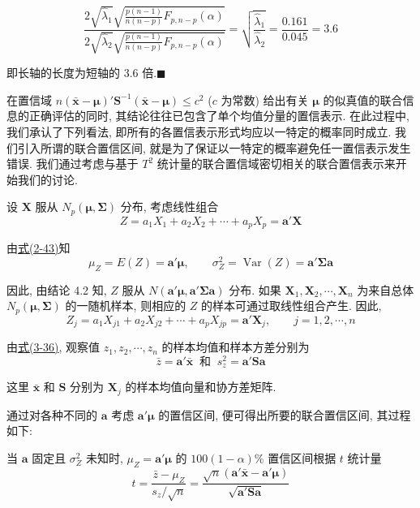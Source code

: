 \[
\frac{2\sqrt{\hat{\lambda}_{1}}\sqrt{\frac{p(n-1)}{n(n-p)}F_{p,n-p}(\alpha)}}{2\sqrt{\hat{\lambda}_{2}}\sqrt{\frac{p(n-1)}{n(n-p)}F_{p,n-p}(\alpha)}}=\sqrt{\frac{\hat{\lambda}_{1}}{\hat{\lambda}_{2}}}=\frac{0.161}{0.045}=3.6
\]

即长轴的长度为短轴的 3.6 倍.\hfill$\blacksquare$


在置信域 $n(\bar{\mathbf{x}}-\boldsymbol{\mu})'\mathbf{S}^{-1}(\bar{\mathbf{x}}-\boldsymbol{\mu})\le c^{2}$ ($c$ 为常数) 给出有关 $\boldsymbol{\mu}$ 的似真值的联合信息的正确评估的同时, 其结论往往已包含了单个均值分量的置信表示. 在此过程中, 我们承认了下列看法, 即所有的各置信表示形式均应以一特定的概率同时成立. 我们引入所谓的联合置信区间, 就是为了保证以一特定的概率避免任一置信表示发生错误. 我们通过考虑与基于 $T^{2}$ 统计量的联合置信域密切相关的联合置信表示来开始我们的讨论.

设 $\mathbf{X}$ 服从 $N_{p}(\boldsymbol{\mu},\boldsymbol{\Sigma})$ 分布, 考虑线性组合
\[
Z=a_{1}X_{1}+a_{2}X_{2}+\cdots+a_{p}X_{p}=\mathbf{a}'\mathbf{X}
\]

由\hyperref[eq:2-43]{式(2-43)}知
\[
\mu_{Z}=E(Z)=\mathbf{a}'\boldsymbol{\mu}, \qquad \sigma_{Z}^{2}=\operatorname{Var}(Z)=\mathbf{a}'\boldsymbol{\Sigma}\mathbf{a}
\]

因此, 由结论 4.2 知, $Z$ 服从 $N(\mathbf{a}'\boldsymbol{\mu},\mathbf{a}'\boldsymbol{\Sigma}\mathbf{a})$ 分布. 如果 $\mathbf{X}_{1},\mathbf{X}_{2},\cdots,\mathbf{X}_{n}$ 为来自总体 $N_{p}(\boldsymbol{\mu},\boldsymbol{\Sigma})$ 的一随机样本, 则相应的 $Z$ 的样本可通过取线性组合产生. 因此,
\[
Z_{j}=a_{1}X_{j1}+a_{2}X_{j2}+\cdots+a_{p}X_{jp}=\mathbf{a}'\mathbf{X}_{j}, \qquad j=1,2,\cdots,n
\]

由\hyperref[eq:3-36]{式(3-36)}, 观察值 $z_{1},z_{2},\cdots,z_{n}$ 的样本均值和样本方差分别为
\[
\bar{z}=\mathbf{a}'\bar{\mathbf{x}} \ \text{ 和 }\ s_{z}^{2}=\mathbf{a}'\mathbf{S}\mathbf{a}
\]

这里 $\bar{\mathbf{x}}$ 和 $\mathbf{S}$ 分别为 $\mathbf{X}_{j}$ 的样本均值向量和协方差矩阵.

通过对各种不同的 $\mathbf{a}$ 考虑 $\mathbf{a}'\boldsymbol{\mu}$ 的置信区间, 便可得出所要的联合置信区间, 其过程如下:

当 $\mathbf{a}$ 固定且 $\sigma_{Z}^{2}$ 未知时, $\mu_{Z}=\mathbf{a}'\boldsymbol{\mu}$ 的 $100(1-\alpha)\%$ 置信区间根据 $t$ 统计量
\label{eq:5-20}
\begin{equation}
t=\frac{\bar{z}-\mu_{Z}}{s_{z}/\sqrt{n}}=\frac{\sqrt{n}(\mathbf{a}'\bar{\mathbf{x}}-\mathbf{a}'\boldsymbol{\mu})}{\sqrt{\mathbf{a}'\mathbf{S}\mathbf{a}}} \tag{5-20}
\end{equation}

